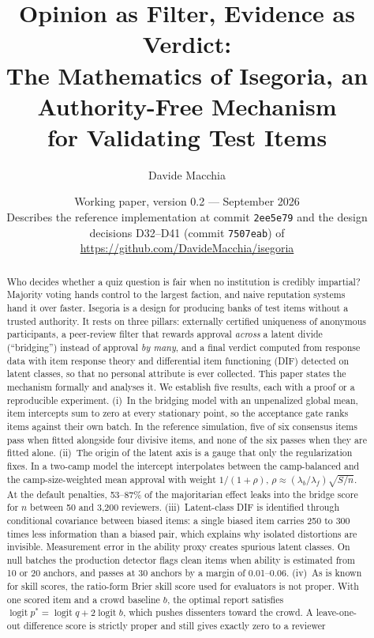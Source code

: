 \documentclass[11pt,a4paper]{article}
\title{Opinion as Filter, Evidence as Verdict:\\
The Mathematics of Isegoria, an Authority-Free Mechanism\\ for Validating Test Items}
\author{Davide Macchia}
\date{Working paper, version 0.2 --- September 2026\\[0.3em]
\small Describes the reference implementation at commit \texttt{2ee5e79} and the design
decisions D32--D41 (commit \texttt{7507eab}) of \url{https://github.com/DavideMacchia/isegoria}}
\begin{document}
\maketitle

\begin{abstract}
\noindent
Who decides whether a quiz question is fair when no institution is credibly impartial?
Majority voting hands control to the largest faction, and naive reputation systems hand it
over faster. Isegoria is a design for producing banks of test items without a trusted
authority. It rests on three pillars: externally certified uniqueness of anonymous
participants, a peer-review filter that rewards approval \emph{across} a latent divide
(``bridging'') instead of approval \emph{by many}, and a final verdict computed from
response data with item response theory and differential item functioning (DIF) detected on
latent classes, so that no personal attribute is ever collected. This paper states the
mechanism formally and analyses it. We establish five results, each with a proof or a
reproducible experiment.
(i)~In the bridging model with an unpenalized global mean, item intercepts sum to zero at
every stationary point, so the acceptance gate ranks items against their own batch. In the
reference simulation, five of six consensus items pass when fitted alongside four divisive
items, and none of the six passes when they are fitted alone.
(ii)~The origin of the latent axis is a gauge that only the regularization fixes. In a
two-camp model the intercept interpolates between the camp-balanced and the camp-size-weighted
mean approval with weight $1/(1+\rho)$, $\rho\approx(\lambda_b/\lambda_f)\sqrt{S/n}$. At the
default penalties, 53--87\% of the majoritarian effect leaks into the bridge score for $n$
between 50 and 3{,}200 reviewers.
(iii)~Latent-class DIF is identified through conditional covariance between biased items:
a single biased item carries 250 to 300 times less information than a biased pair, which
explains why isolated distortions are invisible. Measurement error in the ability proxy
creates spurious latent classes. On null batches the production detector flags clean items
when ability is estimated from 10 or 20 anchors, and passes at 30 anchors by a margin of 0.01--0.06.
(iv)~As is known for skill scores, the ratio-form Brier skill score used for evaluators is not
proper. With one scored item and a crowd baseline $b$, the optimal report satisfies
$\operatorname{logit}p^{*}=\operatorname{logit}q+2\operatorname{logit}b$, which pushes
dissenters toward the crowd.
A leave-one-out difference score is strictly proper and still gives exactly zero to a reviewer

\end{abstract}
\end{document}
